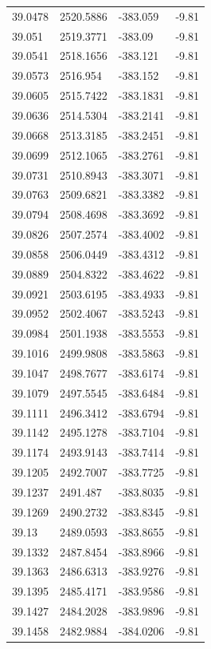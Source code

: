 \begin{table}[H]
\begin{tabular}{llll}
39.0478 & 2520.5886 & -383.059 & -9.81 \\
39.051 & 2519.3771 & -383.09 & -9.81 \\
39.0541 & 2518.1656 & -383.121 & -9.81 \\
39.0573 & 2516.954 & -383.152 & -9.81 \\
39.0605 & 2515.7422 & -383.1831 & -9.81 \\
39.0636 & 2514.5304 & -383.2141 & -9.81 \\
39.0668 & 2513.3185 & -383.2451 & -9.81 \\
39.0699 & 2512.1065 & -383.2761 & -9.81 \\
39.0731 & 2510.8943 & -383.3071 & -9.81 \\
39.0763 & 2509.6821 & -383.3382 & -9.81 \\
39.0794 & 2508.4698 & -383.3692 & -9.81 \\
39.0826 & 2507.2574 & -383.4002 & -9.81 \\
39.0858 & 2506.0449 & -383.4312 & -9.81 \\
39.0889 & 2504.8322 & -383.4622 & -9.81 \\
39.0921 & 2503.6195 & -383.4933 & -9.81 \\
39.0952 & 2502.4067 & -383.5243 & -9.81 \\
39.0984 & 2501.1938 & -383.5553 & -9.81 \\
39.1016 & 2499.9808 & -383.5863 & -9.81 \\
39.1047 & 2498.7677 & -383.6174 & -9.81 \\
39.1079 & 2497.5545 & -383.6484 & -9.81 \\
39.1111 & 2496.3412 & -383.6794 & -9.81 \\
39.1142 & 2495.1278 & -383.7104 & -9.81 \\
39.1174 & 2493.9143 & -383.7414 & -9.81 \\
39.1205 & 2492.7007 & -383.7725 & -9.81 \\
39.1237 & 2491.487 & -383.8035 & -9.81 \\
39.1269 & 2490.2732 & -383.8345 & -9.81 \\
39.13 & 2489.0593 & -383.8655 & -9.81 \\
39.1332 & 2487.8454 & -383.8966 & -9.81 \\
39.1363 & 2486.6313 & -383.9276 & -9.81 \\
39.1395 & 2485.4171 & -383.9586 & -9.81 \\
39.1427 & 2484.2028 & -383.9896 & -9.81 \\
39.1458 & 2482.9884 & -384.0206 & -9.81 \\

\end{tabular}
\end{table}
